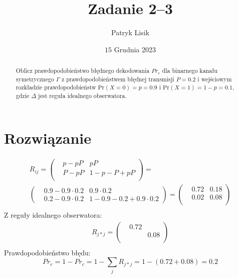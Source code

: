 \documentclass[12pt]{article}
\title{Zadanie 2--3}
\author{Patryk Lisik}
\date{\(15\) Grudnia  2023}
\begin{document}
\maketitle
\renewcommand{\abstractname}{Treść}

\begin{abstract}
    Oblicz prawdopodobieństwo błędnego dekodowania $Pr_e$ dla binarnego kanału symetrycznego 
    $\Gamma$ z prawdopodobieństwem błędnej transmisji $P=0.2$ i wejściowym rozkładzie prawdopodobieństw
   $\text{Pr}(X=0) = p=0.9 $ i $\text{Pr}(X=1)=1-p=0.1$, gdzie $\Delta$ jest reguła idealnego obserwatora. 
\end{abstract}


\section*{Rozwiązanie}
\begin{multline*}
    R_{ij} = 
    \begin{pmatrix}
        & p-pP & pP \\
        & P-pP & 1-p-P+pP \\
    \end{pmatrix} = \\ 
       \begin{pmatrix}
        & 0.9-0.9 \cdot 0.2   & 0.9 \cdot 0.2 \\ 
        & 0.2 - 0.9 \cdot 0.2 & 1-0.9-0.2+0.9 \cdot 0.2
    \end{pmatrix} = 
    \begin{pmatrix}
        & 0.72 & 0.18 \\ 
        & 0.02 & 0.08 \\
    \end{pmatrix}\\
    \end{multline*}
Z reguły idealnego obserwatora:
\begin{align*}
    R_{j*j}=
    \begin{pmatrix}
        & 0.72 &  \\
        &  & 0.08 \\
    \end{pmatrix}  \\ 
\end{align*}
Prawdopodobieństwo błędu:
$$
Pr_e = 1 - Pr_c= 1 - \sum_j R_{j*j} = 1- (0.72+0.08) = 0.2
$$
\end{document}
